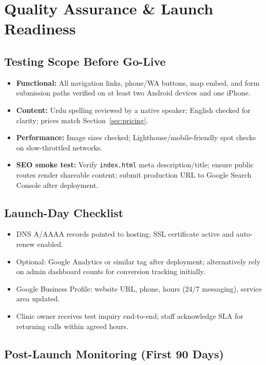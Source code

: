 \documentclass[12pt, a4paper]{article}
\begin{document}
\section{Quality Assurance \& Launch Readiness}

\subsection{Testing Scope Before Go-Live}

\begin{itemize}[leftmargin=1.4em]
    \item \textbf{Functional:} All navigation links, phone/WA buttons, map embed, and form submission paths verified on at least two Android devices and one iPhone.
    \item \textbf{Content:} Urdu spelling reviewed by a native speaker; English checked for clarity; prices match Section~\ref{sec:pricing}.
    \item \textbf{Performance:} Image sizes checked; Lighthouse/mobile-friendly spot checks on slow-throttled networks.
    \item \textbf{SEO smoke test:} Verify \texttt{index.html} meta description/title; ensure public routes render shareable content; submit production URL to Google Search Console after deployment.
\end{itemize}

\subsection{Launch-Day Checklist}

\begin{itemize}[leftmargin=1.4em]
    \item DNS A/AAAA records pointed to hosting; SSL certificate active and auto-renew enabled.
    \item Optional: Google Analytics or similar tag after deployment; alternatively rely on admin dashboard counts for conversion tracking initially.
    \item Google Business Profile: website URL, phone, hours (24/7 messaging), service area updated.
    \item Clinic owner receives test inquiry end-to-end; staff acknowledge SLA for returning calls within agreed hours.
\end{itemize}

\subsection{Post-Launch Monitoring (First 90 Days)}
\end{document}
